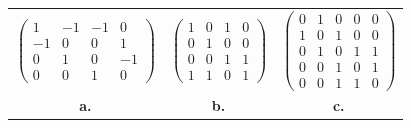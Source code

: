 \documentclass[11pt, oneside]{article}
\begin{document}
\begin{enumerate}
    \begin{center}
      \begin{tabular}[h]{c@{\qquad}c@{\qquad}c}
        $\left(\begin{array}{rrrr}
        1 & -1 & -1 & 0\\
        -1 & 0 & 0 & 1\\
        0 & 1 & 0 & -1\\
        0 & 0 & 1 & 0\end{array}\right)$ & 
        $\left(\begin{array}{cccc}
        1 & 0 & 1 & 0\\
        0 & 1 & 0 & 0\\
        0 & 0 & 1 & 1\\
        1 & 1 & 0 & 1\end{array}\right)$ &
        $\left(\begin{array}{ccccc}
        0 & 1 & 0 & 0 & 0  \\
        1 & 0 & 1 & 0  & 0 \\
        0 & 1 & 0 & 1 & 1\\
        0 & 0 & 1 & 0 & 1\\
        0 & 0 & 1 & 1 & 0\end{array}\right) $
        \\
        \textbf{a.} &
        \textbf{b.}  &
        \textbf{c.} 
      \end{tabular}
    \end{center}


\end{enumerate}
\end{document}
